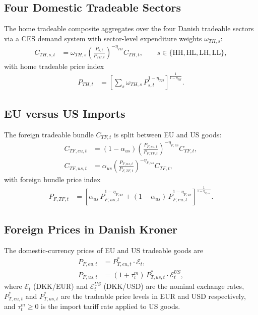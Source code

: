 \documentclass[12pt,a4paper]{article}
\begin{document}
\subsection{Four Domestic Tradeable Sectors}

The home tradeable composite aggregates over the four Danish tradeable sectors via a CES demand system with sector-level expenditure weights $\omega_{TH,s}$:
\begin{align}
    C_{TH,s,t} &= \omega_{TH,s}\left(\frac{P_{s,t}}{P_{TH,t}}\right)^{-\eta_{TH}} C_{TH,t},
    \qquad s \in \{\text{HH},\text{HL},\text{LH},\text{LL}\},
    \label{eq:CTH_s}
\end{align}
with home tradeable price index
\begin{align}
    P_{TH,t} &= \left[
        \sum_{s} \omega_{TH,s}\,P_{s,t}^{1-\eta_{TH}}
    \right]^{\!\frac{1}{1-\eta_{TH}}}.
    \label{eq:PTH}
\end{align}

\subsection{EU versus US Imports}

The foreign tradeable bundle $C_{TF,t}$ is split between EU and US goods:
\begin{align}
    C_{TF,eu,t} &= (1-\alpha_{us})\left(\frac{P_{F,eu,t}}{P_{F,TF,t}}\right)^{-\eta_{F,us}} C_{TF,t},
    \label{eq:CTF_eu}\\
    C_{TF,us,t} &= \alpha_{us}\left(\frac{P_{F,us,t}}{P_{F,TF,t}}\right)^{-\eta_{F,us}} C_{TF,t},
    \label{eq:CTF_us}
\end{align}
with foreign bundle price index
\begin{align}
    P_{F,TF,t} &= \left[
        \alpha_{us}\,P_{F,us,t}^{1-\eta_{F,us}} + (1-\alpha_{us})\,P_{F,eu,t}^{1-\eta_{F,us}}
    \right]^{\!\frac{1}{1-\eta_{F,us}}}.
    \label{eq:PFTF}
\end{align}

\subsection{Foreign Prices in Danish Kroner}

The domestic-currency prices of EU and US tradeable goods are
\begin{align}
    P_{F,eu,t} &= P^*_{T,eu,t}\cdot\mathcal{E}_t,
    \label{eq:PF_eu}\\
    P_{F,us,t} &= (1+\tau^m_t)\,P^*_{T,us,t}\cdot\mathcal{E}^{US}_t,
    \label{eq:PF_us}
\end{align}
where $\mathcal{E}_t$ (DKK/EUR) and $\mathcal{E}^{US}_t$ (DKK/USD) are the nominal exchange rates, $P^*_{T,eu,t}$ and $P^*_{T,us,t}$ are the tradeable price levels in EUR and USD respectively, and $\tau^m_t \geq 0$ is the import tariff rate applied to US goods.
\end{document}
